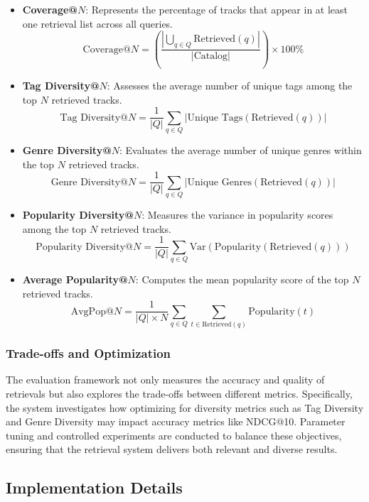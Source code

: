 \documentclass[sigconf]{acmart}
\begin{document}
\begin{itemize}
    \item \textbf{Coverage@\( N \)}: Represents the percentage of tracks that appear in at least one retrieval list across all queries.
    \[
    \text{Coverage@}N = \left( \frac{|\bigcup_{q \in Q} \text{Retrieved}(q)|}{|\text{Catalog}|} \right) \times 100\%
    \]
    
    \item \textbf{Tag Diversity@\( N \)}: Assesses the average number of unique tags among the top \( N \) retrieved tracks.
    \[
    \text{Tag Diversity@}N = \frac{1}{|Q|} \sum_{q \in Q} |\text{Unique Tags}(\text{Retrieved}(q))|
    \]
    
    \item \textbf{Genre Diversity@\( N \)}: Evaluates the average number of unique genres within the top \( N \) retrieved tracks.
    \[
    \text{Genre Diversity@}N = \frac{1}{|Q|} \sum_{q \in Q} |\text{Unique Genres}(\text{Retrieved}(q))|
    \]
    
    \item \textbf{Popularity Diversity@\( N \)}: Measures the variance in popularity scores among the top \( N \) retrieved tracks.
    \[
    \text{Popularity Diversity@}N = \frac{1}{|Q|} \sum_{q \in Q} \text{Var}(\text{Popularity}(\text{Retrieved}(q)))
    \]
    
    \item \textbf{Average Popularity@\( N \)}: Computes the mean popularity score of the top \( N \) retrieved tracks.
    \[
    \text{AvgPop@}N = \frac{1}{|Q| \times N} \sum_{q \in Q} \sum_{t \in \text{Retrieved}(q)} \text{Popularity}(t)
    \]
\end{itemize}

\subsubsection{Trade-offs and Optimization}

The evaluation framework not only measures the accuracy and quality of retrievals but also explores the trade-offs between different metrics. Specifically, the system investigates how optimizing for diversity metrics such as Tag Diversity and Genre Diversity may impact accuracy metrics like NDCG@10. Parameter tuning and controlled experiments are conducted to balance these objectives, ensuring that the retrieval system delivers both relevant and diverse results.

\subsection{Implementation Details}
\label{subsec:implementation_details}
\end{document}
